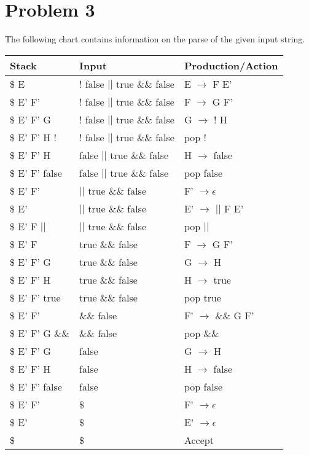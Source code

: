 \documentclass{article}
\providecommand{\prob}[1]{\section*{Problem #1}}
\begin{document}
    \pagebreak
    \prob{3}
    The following chart contains information on the parse of the given input string.
    \begin{center}
        \begin{tabular}{l|l|l}
            \textbf{Stack} & \textbf{Input} & \textbf{Production/Action} \\ \hline
            \$ E            & ! false $||$ true \&\& false & E $\to$ F E'      \\
            \$ E' F'        & ! false $||$ true \&\& false & F $\to$ G F'      \\
            \$ E' F' G      & ! false $||$ true \&\& false & G $\to$ ! H       \\
            \$ E' F' H !    & ! false $||$ true \&\& false & pop !             \\
            \$ E' F' H      & false $||$ true \&\& false   & H $\to$ false     \\
            \$ E' F' false  & false $||$ true \&\& false   & pop false         \\
            \$ E' F'        & $||$ true \&\& false         & F' $\to \epsilon$ \\
            \$ E'           & $||$ true \&\& false         & E' $\to$ $||$ F E'\\
            \$ E' F $||$    & $||$ true \&\& false         & pop $||$          \\
            \$ E' F         & true \&\& false              & F $\to$ G F'      \\
            \$ E' F' G      & true \&\& false              & G $\to$ H         \\
            \$ E' F' H      & true \&\& false              & H $\to$ true      \\
            \$ E' F' true   & true \&\& false              & pop true          \\
            \$ E' F'        & \&\& false                   & F' $\to$ \&\& G F'\\
            \$ E' F' G \&\& & \&\& false                   & pop \&\&          \\
            \$ E' F' G      & false                        & G $\to$ H         \\
            \$ E' F' H      & false                        & H $\to$ false     \\
            \$ E' F' false  & false                        & pop false         \\
            \$ E' F'        & \$                           & F' $\to \epsilon$ \\
            \$ E'           & \$                           & E' $\to \epsilon$ \\
            \$              & \$                           & Accept            \\
        \end{tabular}
    \end{center}
    
\end{document}

